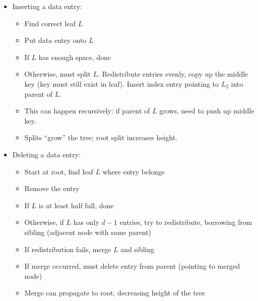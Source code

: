 \documentclass[landscape,8pt]{extarticle}
\begin{document}
\begin{multicols}{4}
\begin{itemize}
\begin{itemize}
\begin{itemize}
                            \item Inserting a data entry:
                                  \begin{itemize}
                                      \item Find correct leaf $L$
                                      \item Put data entry onto $L$
                                      \item If $L$ has enough space, done
                                      \item Otherwise, must split $L$. Redistribute entries evenly, copy up the middle key (key must still exist in leaf). Insert index entry pointing to $L_2$ into parent of $L$.
                                      \item This can happen recursively: if parent of $L$ grows, need to push up middle key.
                                      \item Splits ``grow'' the tree; root split increases height.
                                  \end{itemize}
                            \item Deleting a data entry:
                                  \begin{itemize}
                                      \item Start at root, find leaf $L$ where entry belongs
                                      \item Remove the entry
                                      \item If $L$ is at least half full, done
                                      \item Otherwise, if $L$ has only $d-1$ entries, try to redistribute, borrowing from sibling (adjacent node with same parent)
                                      \item If redistribution fails, merge $L$ and sibling
                                      \item If merge occurred, must delete entry from parent (pointing to merged node)
                                      \item Merge can propagate to root, decreasing height of the tree
                                  \end{itemize}
                        \end{itemize}
              \end{itemize}
    \end{itemize}

\end{multicols}
\end{document}
